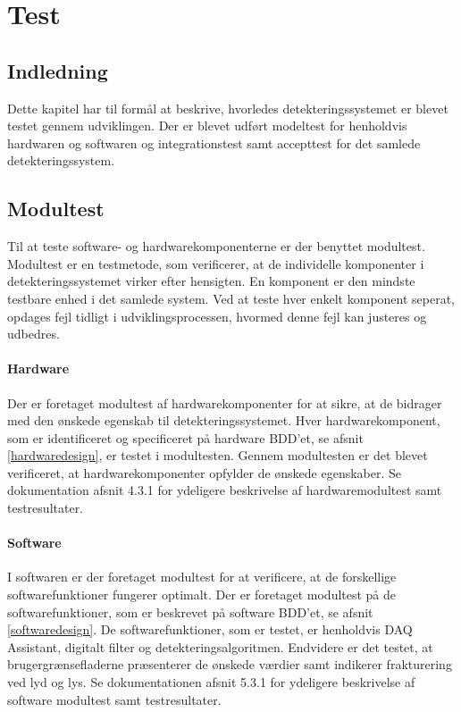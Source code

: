 \chapter{Test}

\section*{Indledning}
Dette kapitel har til formål at beskrive, hvorledes detekteringssystemet er blevet testet gennem udviklingen. Der er blevet udført modeltest for henholdvis hardwaren og softwaren og  integrationstest samt accepttest for det samlede detekteringssystem. 

\section{Modultest}
Til at teste software- og hardwarekomponenterne er der benyttet modultest. Modultest er en testmetode, som verificerer, at de individelle komponenter i detekteringssystemet virker efter hensigten. En komponent er den mindste testbare enhed i det samlede system. Ved at teste hver enkelt komponent seperat, opdages fejl tidligt i udviklingsprocessen, hvormed denne fejl kan justeres og udbedres. 

\subsubsection{Hardware}
Der er foretaget modultest af hardwarekomponenter for at sikre, at de bidrager med den ønskede egenskab til detekteringssystemet. Hver hardwarekomponent, som er identificeret og specificeret på hardware BDD'et, se afsnit \ref{hardwaredesign}, er testet i modultesten. Gennem modultesten er det blevet verificeret, at hardwarekomponenter opfylder de ønskede egenskaber. Se dokumentation afsnit 4.3.1 for ydeligere beskrivelse af hardwaremodultest samt testresultater. 

\subsubsection{Software}
I softwaren er der foretaget modultest for at verificere, at de forskellige softwarefunktioner fungerer optimalt. Der er foretaget modultest på de softwarefunktioner, som er beskrevet på software BDD'et, se afsnit \ref{softwaredesign}. De softwarefunktioner, som er testet, er henholdvis DAQ Assistant, digitalt filter og detekteringsalgoritmen. Endvidere er det testet, at brugergrænsefladerne præsenterer de ønskede værdier samt indikerer frakturering ved lyd og lys. Se dokumentationen afsnit 5.3.1 for ydeligere beskrivelse af software modultest samt testresultater.     


